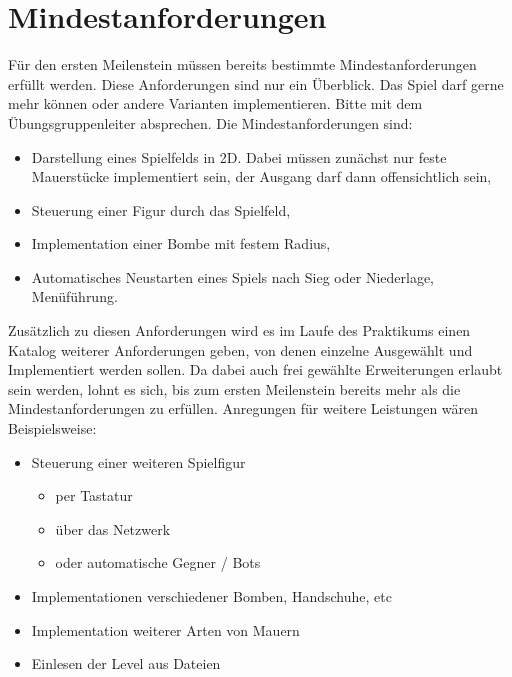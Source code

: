 \documentclass{programmierpraktikum}
\begin{document}
\section{Mindestanforderungen}
Für den ersten Meilenstein müssen bereits bestimmte Mindestanforderungen erfüllt werden. Diese
Anforderungen sind nur ein Überblick. Das Spiel darf gerne mehr können oder andere Varianten
implementieren. Bitte mit dem Übungsgruppenleiter absprechen.
Die Mindestanforderungen sind:
\begin{itemize}
  \item Darstellung eines Spielfelds in 2D. Dabei müssen zunächst nur feste Mauerstücke implementiert sein, der Ausgang darf dann offensichtlich sein,
  \item Steuerung einer Figur durch das Spielfeld,
  \item Implementation einer Bombe mit festem Radius,
  \item Automatisches Neustarten eines Spiels nach Sieg oder Niederlage, Menüführung.
\end{itemize}
Zusätzlich zu diesen Anforderungen wird es im Laufe des Praktikums einen Katalog weiterer
Anforderungen geben, von denen einzelne Ausgewählt und Implementiert werden sollen. Da dabei
auch frei gewählte Erweiterungen erlaubt sein werden, lohnt es sich, bis zum ersten Meilenstein
bereits mehr als die Mindestanforderungen zu erfüllen.
Anregungen für weitere Leistungen wären Beispielsweise:
\begin{itemize}
  \item Steuerung einer weiteren Spielfigur
    \begin{itemize}
      \item per Tastatur
      \item über das Netzwerk
      \item oder automatische Gegner / Bots
    \end{itemize}
  \item Implementationen verschiedener Bomben, Handschuhe, etc
  \item Implementation weiterer Arten von Mauern
  \item Einlesen der Level aus Dateien
\end{itemize}
\end{document}

